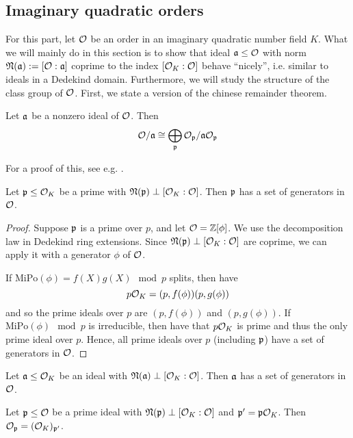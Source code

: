 \subsection{Imaginary quadratic orders}
For this part, let $\mathcal{O}$ be an order in an imaginary quadratic number field $K$.
What we will mainly do in this section is to show that ideal $\mathfrak{a} \leq \mathcal{O}$ with norm $\mathfrak{N}(\mathfrak{a}) := [\mathcal{O} : \mathfrak{a}]$ coprime to the index $[\mathcal{O}_K : \mathcal{O}]$ behave ``nicely'', i.e. similar to ideals in a Dedekind domain.
Furthermore, we will study the structure of the class group of $\mathcal{O}$.
First, we state a version of the chinese remainder theorem.
\begin{lemma}
    Let $\mathfrak{a}$ be a nonzero ideal of $\mathcal{O}$. Then
    \begin{equation*}
        \mathcal{O}/\mathfrak{a} \cong \bigoplus_{\mathfrak{p}} \mathcal{O}_{\mathfrak{p}}/\mathfrak{a}\mathcal{O}_{\mathfrak{p}}
    \end{equation*}
\end{lemma}
For a proof of this, see e.g. \cite[Prop.~I.12.3]{neukirch}.
\begin{lemma}
    Let $\mathfrak{p} \leq \mathcal{O}_K$ be a prime with $\mathfrak{N}(\mathfrak{p}) \perp [\mathcal{O}_K : \mathcal{O}]$.
    Then $\mathfrak{p}$ has a set of generators in $\mathcal{O}$.
\end{lemma}
\begin{proof}
    Suppose $\mathfrak{p}$ is a prime over $p$, and let $\mathcal{O} = \mathbb{Z}[\phi]$.
    We use the decomposition law in Dedekind ring extensions.
    Since $\mathfrak{N}(\mathfrak{p}) \perp [\mathcal{O}_K : \mathcal{O}]$ are coprime, we can apply it with a generator $\phi$ of $\mathcal{O}$.

    If $\mathrm{MiPo}(\phi) = f(X)g(X) \mod p$ splits, then have
    \begin{equation*}
        p\mathcal{O}_K = (p, f(\phi))(p, g(\phi))
    \end{equation*}
    and so the prime ideals over $p$ are $(p, f(\phi))$ and $(p, g(\phi))$.
    If $\mathrm{MiPo}(\phi) \mod p$ is irreducible, then have that $p\mathcal{O}_K$ is prime and thus the only prime ideal over $p$.
    Hence, all prime ideals over $p$ (including $\mathfrak{p}$) have a set of generators in $\mathcal{O}$.
\end{proof}
\begin{corollary}
    \label{prop:generators_in_order}
    Let $\mathfrak{a} \leq \mathcal{O}_K$ be an ideal with $\mathfrak{N}(\mathfrak{a}) \perp [\mathcal{O}_K : \mathcal{O}]$. Then $\mathfrak{a}$ has a set of generators in $\mathcal{O}$.
\end{corollary}
\begin{prop}
    \label{prop:prime_coprime_localization_same}
    Let $\mathfrak{p} \leq \mathcal{O}$ be a prime ideal with $\mathfrak{N}(\mathfrak{p}) \perp [\mathcal{O}_K : \mathcal{O}]$ and $\mathfrak{p}' = \mathfrak{p}\mathcal{O}_K$.
    Then $\mathcal{O}_{\mathfrak{p}} = (\mathcal{O}_K)_{\mathfrak{p}'}$.
\end{prop}
